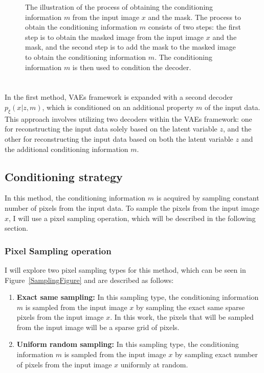 \begin{figure}
    \centering
    
    \caption[The illustration of the process of obtaining the conditioning information $m$ from the input image $x$ and the mask.]%
    {
        The illustration of the process of obtaining the conditioning information $m$ from the input image $x$ and the mask. The process to obtain the conditioning information $m$ consists of two steps: the first step is to obtain the masked image from the input image $x$ and the mask, and the second step is to add the mask to the masked image to obtain the conditioning information $m$. The conditioning information $m$ is then used to condition the decoder.
    }\label{ConditioningFigure}
\end{figure}

\section{}

In the first method, VAEs framework is expanded with a second decoder
$p_\xi(x|z,m)$, which is conditioned on an additional property $m$ of the input
data. This approach involves utilizing two decoders within the VAEs framework:
one for reconstructing the input data solely based on the latent variable $z$,
and the other for reconstructing the input data based on both the latent
variable $z$ and the additional conditioning information $m$.

\subsection{Conditioning strategy}

In this method, the conditioning information $m$ is acquired by sampling
constant number of pixels from the input data. To sample the pixels from the
input image $x$, I will use a pixel sampling operation, which will be described
in the following section.

\subsubsection{Pixel Sampling operation}

I will explore two pixel sampling types for this method,
which can be seen in Figure~\ref{SamplingFigure} and are described as follows:

\begin{enumerate}
    \item \textbf{Exact same sampling:} In this sampling type, the conditioning information $m$ is sampled from the input image $x$ by sampling the exact same sparse pixels from the input image $x$. In this work, the pixels that will be sampled from the input image will be a sparse grid of pixels.
    \item \textbf{Uniform random sampling:} In this sampling type, the conditioning information $m$ is sampled from the input image $x$ by sampling exact number of pixels from the input image $x$ uniformly at random.
\end{enumerate}

